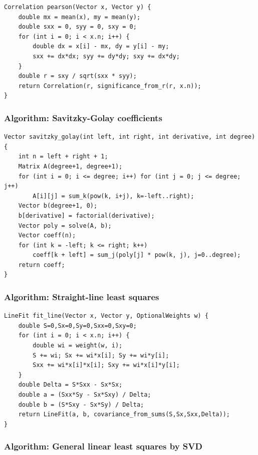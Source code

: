 \documentclass[11pt]{article}
\begin{document}
\begin{verbatim}
Correlation pearson(Vector x, Vector y) {
    double mx = mean(x), my = mean(y);
    double sxx = 0, syy = 0, sxy = 0;
    for (int i = 0; i < x.n; i++) {
        double dx = x[i] - mx, dy = y[i] - my;
        sxx += dx*dx; syy += dy*dy; sxy += dx*dy;
    }
    double r = sxy / sqrt(sxx * syy);
    return Correlation(r, significance_from_r(r, x.n));
}
\end{verbatim}

\subsubsection{Algorithm: Savitzky-Golay coefficients}\label{algorithm-savitzky-golay-coefficients}

\begin{verbatim}
Vector savitzky_golay(int left, int right, int derivative, int degree) {
    int n = left + right + 1;
    Matrix A(degree+1, degree+1);
    for (int i = 0; i <= degree; i++) for (int j = 0; j <= degree; j++)
        A[i][j] = sum_k(pow(k, i+j), k=-left..right);
    Vector b(degree+1, 0);
    b[derivative] = factorial(derivative);
    Vector poly = solve(A, b);
    Vector coeff(n);
    for (int k = -left; k <= right; k++)
        coeff[k + left] = sum_j(poly[j] * pow(k, j), j=0..degree);
    return coeff;
}
\end{verbatim}

\subsubsection{Algorithm: Straight-line least squares}\label{algorithm-straight-line-least-squares}

\begin{verbatim}
LineFit fit_line(Vector x, Vector y, OptionalWeights w) {
    double S=0,Sx=0,Sy=0,Sxx=0,Sxy=0;
    for (int i = 0; i < x.n; i++) {
        double wi = weight(w, i);
        S += wi; Sx += wi*x[i]; Sy += wi*y[i];
        Sxx += wi*x[i]*x[i]; Sxy += wi*x[i]*y[i];
    }
    double Delta = S*Sxx - Sx*Sx;
    double a = (Sxx*Sy - Sx*Sxy) / Delta;
    double b = (S*Sxy - Sx*Sy) / Delta;
    return LineFit(a, b, covariance_from_sums(S,Sx,Sxx,Delta));
}
\end{verbatim}

\subsubsection{Algorithm: General linear least squares by SVD}\label{algorithm-general-linear-least-squares-by-svd}
\end{document}
